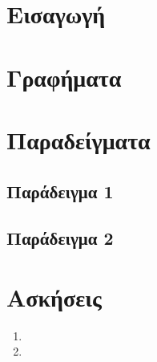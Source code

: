 \section{Εισαγωγή}

\section{Γραφήματα}


\section{Παραδείγματα}

\subsection{Παράδειγμα 1}

\subsection{Παράδειγμα 2}


\section{Ασκήσεις}
\begin{enumerate}
\item 
\item 
\end{enumerate}

\begin{thebibliography}{9}
\end{thebibliography}

